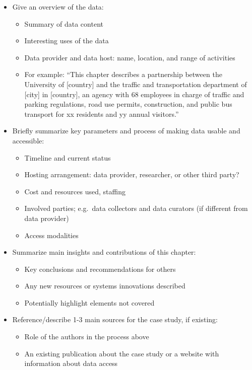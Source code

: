 \documentclass[
]{WileySix}
\providecommand{\tightlist}{%
  \setlength{\itemsep}{0pt}\setlength{\parskip}{0pt}}
\begin{document}
\begin{itemize}
\tightlist
\item
  Give an overview of the data:

  \begin{itemize}
  \tightlist
  \item
    Summary of data content
  \item
    Interesting uses of the data
  \item
    Data provider and data host: name, location, and range of activities
  \item
    For example: ``This chapter describes a partnership between the University of {[}country{]} and the traffic and transportation department of {[}city{]} in {[}country{]}, an agency with 68 employees in charge of traffic and parking regulations, road use permits, construction, and public bus transport for xx residents and yy annual visitors.''
  \end{itemize}
\item
  Briefly summarize key parameters and process of making data usable and accessible:

  \begin{itemize}
  \tightlist
  \item
    Timeline and current status
  \item
    Hosting arrangement: data provider, researcher, or other third party?
  \item
    Cost and resources used, staffing
  \item
    Involved parties; e.g.~data collectors and data curators (if different from data provider)
  \item
    Access modalities
  \end{itemize}
\item
  Summarize main insights and contributions of this chapter:

  \begin{itemize}
  \tightlist
  \item
    Key conclusions and recommendations for others
  \item
    Any new resources or systems innovations described
  \item
    Potentially highlight elements not covered
  \end{itemize}
\item
  Reference/describe 1-3 main sources for the case study, if existing:

  \begin{itemize}
  \tightlist
  \item
    Role of the authors in the process above\\
  \item
    An existing publication about the case study or a website with information about data access
  \end{itemize}
\end{itemize}
\end{document}

